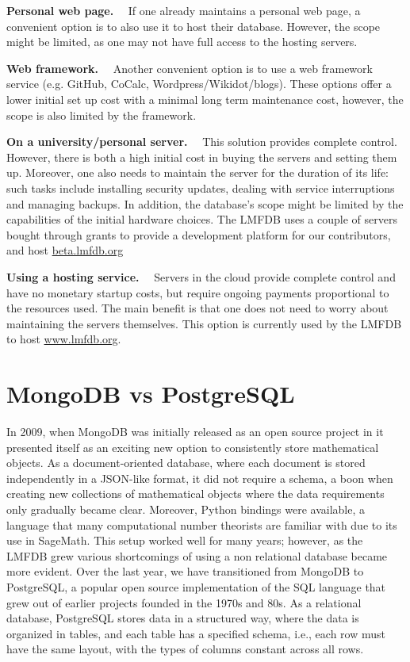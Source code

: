 \documentclass{amsart}
\newcommand{\subhead}[1]{\vspace{0.1in} \noindent \textbf{#1.}\ \ }
\begin{document}
\subhead{Personal web page}
    If one already maintains a personal web page, a convenient option is to also use it to host their database.
    However, the scope might be limited, as one may not have full access to the hosting servers.

\subhead{Web framework}
    Another convenient option is to use a web framework service (e.g. GitHub, CoCalc, Wordpress/Wikidot/blogs).
    These options offer a lower initial set up cost with a minimal long term maintenance cost, however, the scope is also limited by the framework.

\subhead{On a university/personal server}
    This solution provides complete control.
    However, there is both a high initial cost in buying the servers and setting them up.  Moreover, one also needs to maintain the server for the duration of its life: such tasks include installing security updates, dealing with service interruptions and managing backups.
    In addition, the database's scope might be limited by the capabilities of the initial hardware choices.
    The LMFDB uses a couple of servers bought through grants to provide a development platform for our contributors, and host \url{beta.lmfdb.org}

\subhead{Using a hosting service}
Servers in the cloud \cites{aws, gcp} provide complete control and have no monetary startup costs, but require ongoing payments proportional to the resources used.
    The main benefit is that one does not need to worry about maintaining the servers themselves.
    This option is currently used by the LMFDB to host \url{www.lmfdb.org}.


\section{MongoDB vs PostgreSQL}
\label{sec:MvsP}

In 2009, when MongoDB was initially released as an open source project in it presented itself as an exciting new option to consistently store mathematical objects.
As a document-oriented database, where each document is stored independently in a JSON-like format, it did not require a schema, a boon when creating new collections of mathematical objects where the data requirements only gradually became clear.
Moreover, Python bindings were available, a language that many computational number theorists are familiar with due to its use in SageMath.
This setup worked well for many years; however, as the LMFDB grew various shortcomings of using a non relational database became more evident.
Over the last year, we have transitioned from MongoDB to PostgreSQL, a popular open source implementation of the SQL language that grew out of earlier projects founded in the 1970s and 80s.
As a relational database, PostgreSQL stores data in a structured way, where the data is organized in tables, and each table has a specified schema, i.e., each row must have the same layout, with the types of columns constant across all rows.
\end{document}
